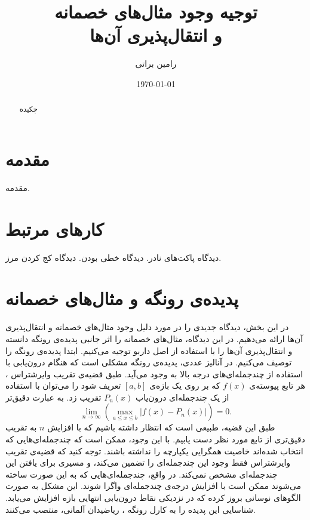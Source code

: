 \documentclass[12pt,onecolumn,a4paper]{article}
\begin{document}
\title{توجیه وجود مثال‌های خصمانه \\ و انتقال‌پذیری آن‌ها} 
\author{رامین براتی}
\date{\today}
\maketitle

\begin{abstract}
چکیده
\end{abstract}

\section{مقدمه} 
مقدمه.

\section{کارهای مرتبط}
دیدگاه پاکت‌های نادر.
دیدگاه خطی بودن.
دیدگاه کج کردن مرز.

\section{پدیده‌ی رونگه و مثال‌های خصمانه}
در این بخش، دیدگاه جدیدی را در مورد دلیل وجود مثال‌های خصمانه و انتقال‌پذیری آن‌ها ارائه می‌دهیم. در این دیدگاه، مثال‌های خصمانه را اثر جانبی پدیده‌ی رونگه دانسته و انتقال‌پذیری آن‌ها را با استفاده از اصل داربو توجیه می‌کنیم. ابتدا پدیده‌ی رونگه را توصیف می‌کنیم. در آنالیز عددی، پدیده‌ی رونگه مشکلی است که هنگام درون‌یابی با استفاده از چندجمله‌ای‌های درجه بالا به وجود می‌آید. طبق قضیه‌ی تقریب وایرشتراس
،
هر تابع پیوسته‌ی 
$f(x)$
که بر روی یک بازه‌ی
$[a,b]$
تعریف شود را می‌توان با استفاده از یک چندجمله‌ای درون‌یاب
$P_n(x)$
تقریب زد. به عبارت دقیق‌تر
\begin{equation*}
    \lim_{n\rightarrow \infty}\left(\max _{{a\leq x\leq b}}\left|f(x)-P_{n}(x)\right|\right)=0.
\end{equation*}
طبق این قضیه، طبیعی است که انتظار داشته باشیم که با افزایش 
$n$
به تقریب دقیق‌تری از تابع مورد نظر دست یابیم. با این وجود، ممکن است که چندجمله‌ای‌هایی که انتخاب شده‌اند خاصیت همگرایی یکپارچه را نداشته باشند. توجه کنید که قضیه‌ی تقریب وایرشتراس فقط وجود این چندجمله‌ای را تضمین می‌کند، و مسیری برای یافتن این چندجمله‌ای مشخص نمی‌کند. در واقع، چندجمله‌ای‌هایی که به این صورت ساخته می‌شوند ممکن است با افزایش درجه‌ی چندجمله‌ای واگرا شوند. این مشکل به صورت الگوهای نوسانی بروز کرده که در نزدیکی نقاط درون‌یابی انتهایی بازه افزایش می‌یابد. شناسایی این پدیده را به  کارل رونگه
،
ریاضیدان آلمانی، منتصب می‌کنند.
\end{document}
